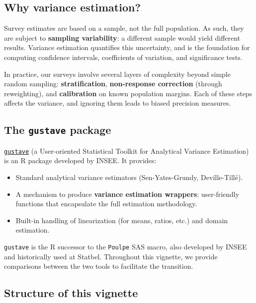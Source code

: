 \documentclass[
]{article}
\providecommand{\tightlist}{%
  \setlength{\itemsep}{0pt}\setlength{\parskip}{0pt}}
\begin{document}
\subsection{Why variance estimation?}\label{why-variance-estimation}

Survey estimates are based on a sample, not the full population. As
such, they are subject to \textbf{sampling variability}: a different
sample would yield different results. Variance estimation quantifies
this uncertainty, and is the foundation for computing confidence
intervals, coefficients of variation, and significance tests.

In practice, our surveys involve several layers of complexity beyond
simple random sampling: \textbf{stratification}, \textbf{non-response
correction} (through reweighting), and \textbf{calibration} on known
population margins. Each of these steps affects the variance, and
ignoring them leads to biased precision measures.

\subsection{\texorpdfstring{The \texttt{gustave}
package}{The gustave package}}\label{the-gustave-package}

\href{https://github.com/InseeFr/gustave}{\texttt{gustave}} (a
User-oriented Statistical Toolkit for Analytical Variance Estimation) is
an R package developed by INSEE. It provides:

\begin{itemize}
\tightlist
\item
  Standard analytical variance estimators (Sen-Yates-Grundy,
  Deville-Tillé).
\item
  A mechanism to produce \textbf{variance estimation wrappers}:
  user-friendly functions that encapsulate the full estimation
  methodology.
\item
  Built-in handling of linearization (for means, ratios, etc.) and
  domain estimation.
\end{itemize}

\texttt{gustave} is the R successor to the \texttt{Poulpe} SAS macro,
also developed by INSEE and historically used at Statbel. Throughout
this vignette, we provide comparisons between the two tools to
facilitate the transition.

\subsection{Structure of this
vignette}\label{structure-of-this-vignette}
\end{document}
